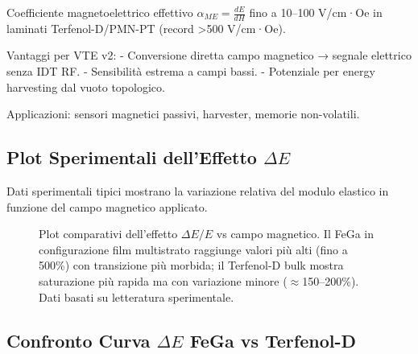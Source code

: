 \documentclass[11pt,a4paper]{article}
\begin{document}
Coefficiente magnetoelettrico effettivo $\alpha_{ME} = \frac{dE}{dH}$ fino a 10–100 V/cm·Oe in laminati Terfenol-D/PMN-PT (record >500 V/cm·Oe).

Vantaggi per VTE v2:
- Conversione diretta campo magnetico → segnale elettrico senza IDT RF.
- Sensibilità estrema a campi bassi.
- Potenziale per energy harvesting dal vuoto topologico.

Applicazioni: sensori magnetici passivi, harvester, memorie non-volatili.

\subsection{Plot Sperimentali dell'Effetto $\Delta E$}

Dati sperimentali tipici mostrano la variazione relativa del modulo elastico in funzione del campo magnetico applicato.

\begin{figure}[h]
\centering
{}
\caption{Plot comparativi dell'effetto $\Delta E/E$ vs campo magnetico. Il FeGa in configurazione film multistrato raggiunge valori più alti (fino a 500\%) con transizione più morbida; il Terfenol-D bulk mostra saturazione più rapida ma con variazione minore ($\approx$150--200\%). Dati basati su letteratura sperimentale.}
\end{figure}

\subsection{Confronto Curva $\Delta E$ FeGa vs Terfenol-D}
\end{document}
